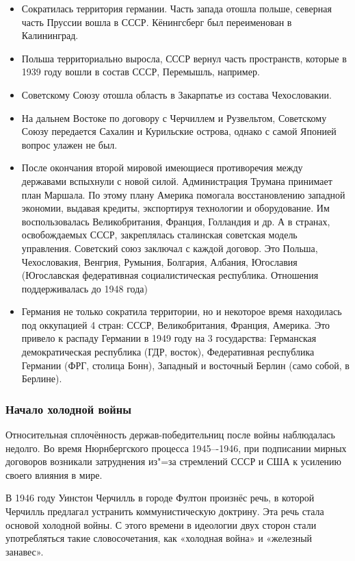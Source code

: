 \begin{itemize}
    \item Сократилась территория германии. Часть запада отошла польше, северная часть Пруссии вошла в СССР. Кёнингсберг был переименован в Калининград.
    \item Польша территориально выросла, СССР вернул часть пространств, которые в 1939 году вошли в состав СССР, Перемышль, например.
    \item Советскому Союзу отошла область в Закарпатье из состава Чехословакии.
    \item На дальнем Востоке по договору с Черчиллем и Рузвельтом, Советскому Союзу передается Сахалин и Курильские острова, однако с самой Японией вопрос улажен не был.
    \item После окончания второй мировой имеющиеся противоречия между державами вспыхнули с новой силой. Администрация Трумана принимает план Маршала. По этому плану Америка помогала восстановлению западной экономии, выдавая кредиты, экспортируя технологии и оборудование. Им воспользовалась Великобритания, Франция, Голландия и др. А в странах, освобождаемых СССР, закреплялась сталинская советская модель управления. Советский союз заключал с каждой договор. Это Польша, Чехословакия, Венгрия, Румыния, Болгария, Албания, Югославия (Югославская федеративная социалистическая республика. Отношения поддерживалась до 1948 года)
    \item Германия не только сократила территории, но и некоторое время находилась под оккупацией 4 стран: СССР, Великобритания, Франция, Америка. Это привело к распаду Германии в 1949 году на 3 государства: Германская демократическая республика (ГДР, восток), Федеративная республика Германии (ФРГ, столица Бонн), Западный и восточный Берлин (само собой, в Берлине).
\end{itemize}

\subsubsection{\textbf{Начало холодной войны}}

Относительная сплочённость держав-победительниц после войны наблюдалась недолго. Во время Нюрнбергского процесса 1945–-1946, при подписании мирных договоров возникали затруднения из"=за стремлений СССР и США к усилению своего влияния в мире.

В 1946 году Уинстон Черчилль в городе Фултон произнёс речь, в которой Черчилль предлагал устранить коммунистическую доктрину. Эта речь стала основой холодной войны. С этого времени в идеологии двух сторон стали употребляться такие словосочетания, как «холодная война» и «железный занавес». 

